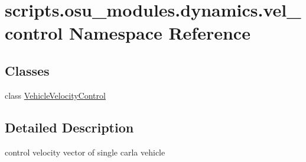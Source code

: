 \hypertarget{namespacescripts_1_1osu__modules_1_1dynamics_1_1vel__control}{}\section{scripts.\+osu\+\_\+modules.\+dynamics.\+vel\+\_\+control Namespace Reference}
\label{namespacescripts_1_1osu__modules_1_1dynamics_1_1vel__control}
\subsection*{Classes}
\begin{DoxyCompactItemize}
\item 
class \hyperlink{classscripts_1_1osu__modules_1_1dynamics_1_1vel__control_1_1VehicleVelocityControl}{Vehicle\+Velocity\+Control}
\end{DoxyCompactItemize}


\subsection{Detailed Description}
\begin{DoxyVerb}control velocity vector of single carla vehicle \end{DoxyVerb}
 